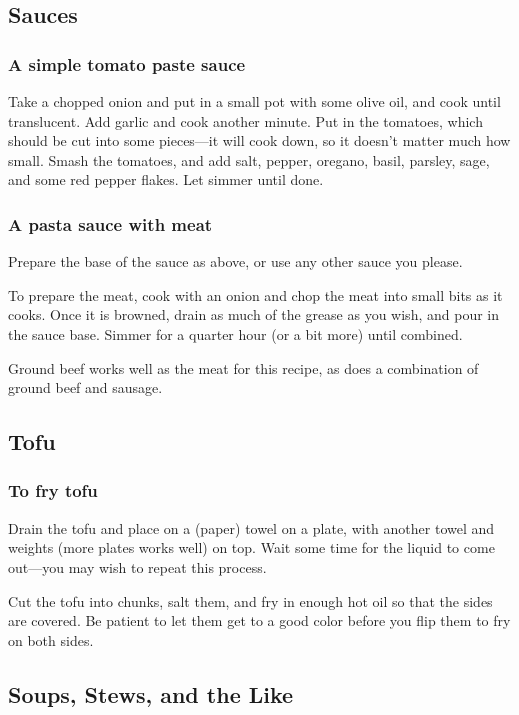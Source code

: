 \documentclass[10pt]{article}
\begin{document}
\subsection*{Sauces}

\subsubsection*{A simple tomato paste sauce}

Take a chopped onion and put in a small pot with some olive oil, and cook until translucent.
Add garlic and cook another minute.
Put in the tomatoes, which should be cut into some pieces---it will cook down, so it doesn't matter much how small.
Smash the tomatoes, and add salt, pepper, oregano, basil, parsley, sage, and some red pepper flakes.
Let simmer until done.

\subsubsection*{A pasta sauce with meat}

Prepare the base of the sauce as above, or use any other sauce you please.

To prepare the meat, cook with an onion and chop the meat into small bits as it cooks.
Once it is browned, drain as much of the grease as you wish, and pour in the sauce base.
Simmer for a quarter hour (or a bit more) until combined.

Ground beef works well as the meat for this recipe, as does a combination of ground beef and sausage.

\subsection*{Tofu}

\subsubsection*{To fry tofu}

Drain the tofu and place on a (paper) towel on a plate, with another towel and weights (more plates works well) on top.
Wait some time for the liquid to come out---you may wish to repeat this process.

Cut the tofu into chunks, salt them, and fry in enough hot oil so that the sides are covered.
Be patient to let them get to a good color before you flip them to fry on both sides.

\subsection*{Soups, Stews, and the Like}
\end{document}
